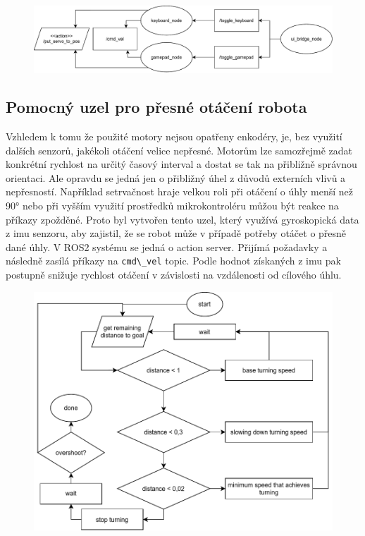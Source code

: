 \begin{figure}[h!]
	\centering
	\includegraphics[scale=0.75]{obrazky-figures/manual_control_diagram.pdf}
	\caption{}
	\label{}
\end{figure}

\subsection*{Pomocný uzel pro přesné otáčení robota}
Vzhledem k tomu že použité motory nejsou opatřeny enkodéry, je, bez využití dalších senzorů, jakékoli otáčení velice nepřesné. Motorům lze samozřejmě zadat konkrétní rychlost na určitý časový interval a dostat se tak na přibližně správnou orientaci. Ale opravdu se jedná jen o přibližný úhel z důvodů externích vlivů a nepřesností. Například setrvačnost hraje velkou roli při otáčení o úhly menší než 90° nebo při vyšším využití prostředků mikrokontroléru můžou být reakce na příkazy zpožděné.
Proto byl vytvořen tento uzel, který využívá gyroskopická data z imu senzoru, aby zajistil, že se robot  může v případě potřeby otáčet o přesně dané úhly. V ROS2 systému se jedná o action server. Přijímá požadavky a následně zasílá příkazy na \verb|cmd\_vel| topic. Podle hodnot získaných z imu pak postupně snižuje rychlost otáčení v závislosti na vzdálenosti od cílového úhlu. 

\begin{figure}[h!]
	\centering
	\includegraphics[scale=0.75]{obrazky-figures/precise_turning.pdf}
	\caption{}
	\label{}
\end{figure}

